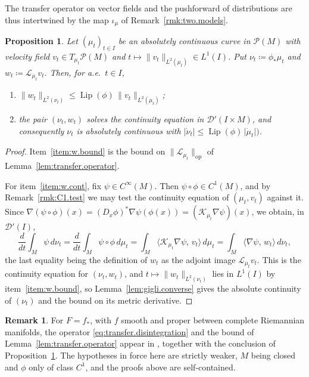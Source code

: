 \documentclass[11pt,reqno]{amsart}
\theoremstyle{plain}
\newtheorem{prp}[thm]{Proposition}
\theoremstyle{definition}
\newtheorem{rmk}[thm]{Remark}
\newcommand{\Prob}{\mathcal{P}}
\newcommand{\Dist}{\mathcal{D}'}
\newcommand{\Koop}{\mathcal{K}}
\newcommand{\Transf}{\mathcal{L}}
\DeclareMathOperator{\Lip}{Lip}
\begin{document}
The transfer operator on vector fields and the pushforward of distributions are thus intertwined by the map \( \iota_\mu \) of Remark~\ref{rmk:two.models}.


\begin{prp}
    \label{prp:functoriality.pushforward}
    Let \( (\mu_t)_{t\in I} \) be an absolutely continuous curve in \( \Prob(M) \) with velocity field \( v_t\in T_{\mu_t}\Prob(M) \) and \( t\mapsto\lVert v_t\rVert_{L^2(\mu_t)}\in L^1(I) \).
    Put \( \nu_t\coloneqq\phi_\ast\mu_t \) and \( w_t\coloneqq\Transf_{\mu_t}v_t \).
    Then, for a.e.\ \( t\in I \),
    \begin{enumerate}
        \item\label{item:w.bound} \( \lVert w_t\rVert_{L^2(\nu_t)}\le\Lip(\phi)\,\lVert v_t\rVert_{L^2(\mu_t)} \);
        \item\label{item:w.cont} the pair \( (\nu_t,w_t) \) solves the continuity equation in \( \Dist(I\times M) \), and consequently \( \nu_t \) is absolutely continuous with \( \lvert\dot\nu_t\rvert\le\Lip(\phi)\,\lvert\dot\mu_t\rvert) \).
    \end{enumerate}
\end{prp}

\begin{proof}
    Item~\ref{item:w.bound} is the bound on \( \lVert\Transf_{\mu_t}\rVert_{\mathrm{op}} \) of Lemma~\ref{lem:transfer.operator}.

    For item~\ref{item:w.cont}, fix \( \psi\in C^\infty(M) \).
    Then \( \psi\circ\phi\in C^1(M) \), and by Remark~\ref{rmk:C1.test} we may test the continuity equation of \( (\mu_t,v_t) \) against it.
    Since \( \nabla(\psi\circ\phi)(x)=(D_x\phi)^{\!\ast}\nabla\psi(\phi(x))=\left(\Koop_{\mu_t}\nabla\psi\right)(x) \), we obtain, in \( \Dist(I) \),
    \[
        \frac{d}{dt}\int_M\psi\,d\nu_t
        =\frac{d}{dt}\int_M\psi\circ\phi\,d\mu_t
        =\int_M\big\langle\Koop_{\mu_t}\nabla\psi,\,v_t\big\rangle\,d\mu_t
        =\int_M\big\langle\nabla\psi,\,w_t\big\rangle\,d\nu_t ,
    \]
    the last equality being the definition of \( w_t \) as the adjoint image \( \Transf_{\mu_t}v_t \).
    This is the continuity equation for \( (\nu_t,w_t) \), and \( t\mapsto\lVert w_t\rVert_{L^2(\nu_t)} \) lies in \( L^1(I) \) by item~\ref{item:w.bound}, so Lemma~\ref{lem:gigli.converse} gives the absolute continuity of \( (\nu_t) \) and the bound on its metric derivative.
\end{proof}

\begin{rmk}
    For \( F=f_\ast \), with \( f \) smooth and proper between complete Riemannian manifolds, the operator \eqref{eq:transfer.disintegration} and the bound of Lemma~\ref{lem:transfer.operator} appear in \cite[Theorem 3.3 and Proposition 3.5]{lessel_differentiable_2020}, together with the conclusion of Proposition~\ref{prp:functoriality.pushforward}.
    The hypotheses in force here are strictly weaker, \( M \) being closed and \( \phi \) only of class \( C^1 \), and the proofs above are self-contained.
\end{rmk}
\end{document}
